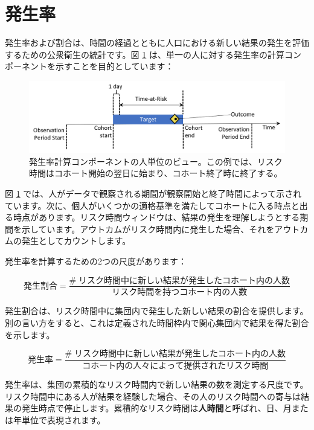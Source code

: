 \documentclass[
  11pt]{book}
\theoremstyle{definition}
\theoremstyle{definition}
\theoremstyle{definition}
\theoremstyle{definition}
\theoremstyle{remark}
\begin{document}
\section{発生率}\label{ux767aux751fux7387}

発生率および割合は、時間の経過とともに人口における新しい結果の発生を評価するための公衆衛生の統計です。図 \ref{fig:incidenceTimeline} は、単一の人に対する発生率の計算コンポーネントを示すことを目的としています： 

\begin{figure}

{\centering \includegraphics[width=1\linewidth]{images/Characterization/incidenceTimeline} 

}

\caption{発生率計算コンポーネントの人単位のビュー。この例では、リスク時間はコホート開始の翌日に始まり、コホート終了時に終了する。}\label{fig:incidenceTimeline}
\end{figure}

図 \ref{fig:incidenceTimeline} では、人がデータで観察される期間が観察開始と終了時間によって示されています。次に、個人がいくつかの適格基準を満たしてコホートに入る時点と出る時点があります。リスク時間ウィンドウは、結果の発生を理解しようとする期間を示しています。アウトカムがリスク時間内に発生した場合、それをアウトカムの発生としてカウントします。

発生率を計算するための2つの尺度があります：

\[
発生割合 = \frac{\#\;リスク時間中に新しい結果が発生したコホート内の人数}{リスク時間を持つコホート内の人数}
\]

発生割合は、リスク時間中に集団内で発生した新しい結果の割合を提供します。別の言い方をすると、これは定義された時間枠内で関心集団内で結果を得た割合を示します。

\[
発生率 = \frac{\#\;リスク時間中に新しい結果が発生したコホート内の人数}{コホート内の人々によって提供されたリスク時間}
\]

発生率は、集団の累積的なリスク時間内で新しい結果の数を測定する尺度です。リスク時間中にある人が結果を経験した場合、その人のリスク時間への寄与は結果の発生時点で停止します。累積的なリスク時間は\textbf{人時間}と呼ばれ、日、月または年単位で表現されます。 
\end{document}
